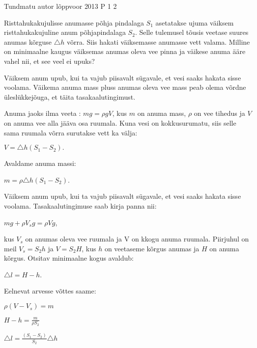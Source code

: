 {Tundmatu autor} %
{lõppvoor} %
{2013} %
{P 1} %
{2} %
{

\ifStatement
Risttahukakujulisse anumasse põhja pindalaga $S_1$ asetatakse ujuma väiksem risttahukakujuline anum põhjapindalaga $S_2$. Selle tulemusel tõusis veetase suures anumas kõrguse $\triangle h$ võrra. Siis hakati väiksemasse anumasse vett valama. Milline on minimaalne kaugus väiksemas anumas oleva vee pinna ja väikese anuma ääre vahel nii, et see veel ei upuks? 
\fi

\ifHint
Väiksem anum upub, kui ta vajub piisavalt sügavale, et vesi saaks hakata sisse voolama. Väikema anuma mass pluss anumas oleva vee mass peab olema võrdne üleslükkejõuga, et täita tasakaalutingimust.
\fi

\ifSolution
Anuma jaoks ilma veeta : $mg = \rho g V$, kus $m$ on anuma mass, $\rho$ on vee tihedus ja $V$ on anuma vee alla jääva osa ruumala. Kuna vesi on kokkusurumatu, siis selle sama ruumala võrra surutakse vett ka välja:
\begin{center}
$V = \triangle h (S_1 - S_2).$
\end{center}
Avaldame anuma massi:
\begin{center}
$m = \rho \triangle h (S_1 - S_2)$.
\end{center}
Väiksem anum upub, kui ta vajub piisavalt sügavale, et vesi saaks hakata sisse voolama. Tasakaalutingimuse saab kirja panna nii: 
\begin{center}
$mg + \rho V_s g = \rho V g$,
\end{center}
kus $V_s$ on anumas oleva vee ruumala ja V on kkogu anuma ruumala. Piirjuhul on meil $V_s = S_2 h $ ja $V = S_2 H$, kus $h$ on veetaseme kõrgus anumas ja $H$ on anuma kõrgus. Otsitav minimaalne kogus avaldub:
\begin{center}
$\triangle l = H - h$.
\end{center}
Eelnevat arvesse võttes saame: 
\begin{center}
$\rho (V - V_s) = m$
\end{center}
\begin{center}
$H - h = \frac{m}{\rho S_2}$
\end{center}
\begin{center}
$\triangle l = \frac{(S_1 - S_2)}{S_2} \triangle h$
\end{center}
\fi
}